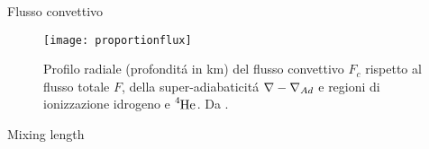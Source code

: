 \begin{frame}{Flusso convettivo}

\begin{figure}[!h]
    \texttt{[image: proportionflux]}
    \caption{Profilo radiale (profondit\'a in \si{\kilo\meter}) del flusso convettivo $F_c$ rispetto al flusso totale $F$, della super-adiabaticit\'a $\nabla-\nabla_{Ad}{}$ e regioni di ionizzazione idrogeno e $\cel{He}{4}{}{}$. Da \cite{gou76convection}.}
    \label{fluxproportion}
\end{figure}

\end{frame}

\begin{frame}{Mixing length}



\end{frame}
